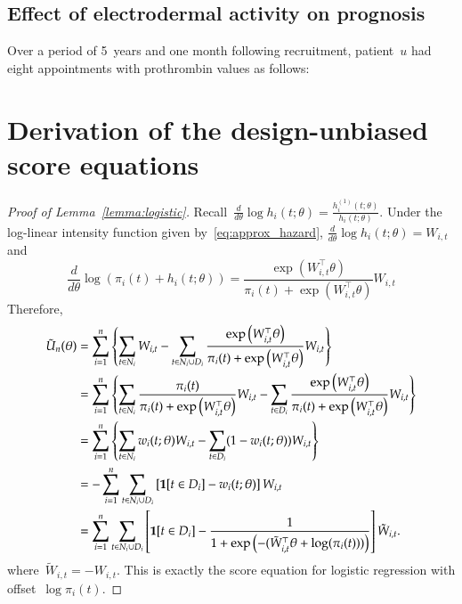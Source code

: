 \documentclass[12pt]{amsart}
\begin{document}
\subsection{Effect of electrodermal activity on prognosis}
Over a period of 5~years and one month following recruitment,
patient~$u$ had eight appointments with prothrombin values as follows:







\appendix

\section{Derivation of the design-unbiased score equations}

\begin{proof}[Proof of Lemma~\ref{lemma:logistic}]
Recall~$\frac{d}{d\theta} \log h_i (t; \theta) = \frac{h^{(1)}_i (t;
  \theta)}{h_i (t; \theta)}$. Under the log-linear
intensity function given by~\eqref{eq:approx_hazard},
$\frac{d}{d\theta} \log h_i (t; \theta) = W_{i,t}$ and 
\[
\frac{d}{d \theta} \log \left( \pi_i (t) + h_i (t;\theta) \right) = 
\frac{\exp \left( W_{i,t}^\top \theta \right)}{\pi_i (t) + \exp
  \left( W_{i,t}^\top \theta \right)} W_{i,t}
\]
Therefore,
\begin{align*}
\tilde U_n (\theta) 
  &= \sum_{i=1}^n \left \{ \sum_{t \in N_i} W_{i,t} -
    \sum_{t \in N_i \cup D_i} \frac{\exp \left( W_{i,t}^\top \theta
    \right)}{\pi_i (t) + \exp \left( W_{i,t}^\top \theta \right)}
    W_{i,t} \right \} \\
  &= \sum_{i=1}^n \left \{ \sum_{t \in N_i} \frac{\pi_i (t)}{\pi_i (t)
    + \exp \left( W_{i,t}^\top \theta \right)} W_{i,t} -
    \sum_{t \in D_i} \frac{\exp \left( W_{i,t}^\top \theta
    \right)}{\pi_i (t) + \exp \left( W_{i,t}^\top \theta \right)}
    W_{i,t} \right \} \\
  &= \sum_{i=1}^n \left \{ \sum_{t \in N_i} w_{i} (t; \theta) W_{i,t} -
    \sum_{t \in D_i} (1 - w_i (t; \theta)) W_{i,t} \right \} \\
  &= - \sum_{i=1}^n \sum_{t \in N_i \cup D_i} \left[ {\bf 1} [t \in
    D_i]  - w_{i} (t; \theta) \right] W_{i,t} \\
  &= \sum_{i=1}^n \sum_{t \in N_i \cup D_i}
    \left[ {\bf 1} [t \in D_i]  - \frac{1}{1 + \exp\left( - (
          \tilde W_{i,t}^\top \theta + \log (\pi_i (t) ) ) \right)}
    \right] \tilde W_{i,t}.
\end{align*}
where~$\tilde W_{i,t} = - W_{i,t}$. This is exactly the score equation
for logistic regression with offset~$\log \pi_i (t)$.
\end{proof}
\end{document}
